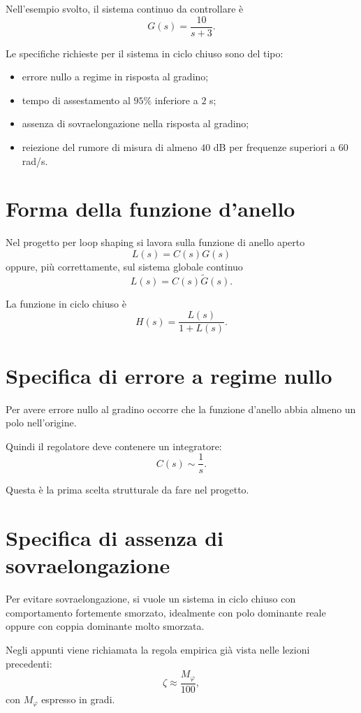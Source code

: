 Nell'esempio svolto, il sistema continuo da controllare \`e
\[
G(s)=\frac{10}{s+3}.
\]

Le specifiche richieste per il sistema in ciclo chiuso sono del tipo:
\begin{itemize}
    \item errore nullo a regime in risposta al gradino;
    \item tempo di assestamento al \(95\%\) inferiore a \(2\) s;
    \item assenza di sovraelongazione nella risposta al gradino;
    \item reiezione del rumore di misura di almeno \(40\) dB per frequenze superiori a \(60\) rad/s.
\end{itemize}

\section{Forma della funzione d'anello}

Nel progetto per loop shaping si lavora sulla funzione di anello aperto
\[
L(s)=C(s)G(s)
\]
oppure, pi\`u correttamente, sul sistema globale continuo
\[
L(s)=C(s)\tilde G(s).
\]

La funzione in ciclo chiuso \`e
\[
H(s)=\frac{L(s)}{1+L(s)}.
\]

\section{Specifica di errore a regime nullo}

Per avere errore nullo al gradino occorre che la funzione d'anello abbia almeno un polo nell'origine.

Quindi il regolatore deve contenere un integratore:
\[
C(s)\sim \frac{1}{s}.
\]

Questa \`e la prima scelta strutturale da fare nel progetto.

\section{Specifica di assenza di sovraelongazione}

Per evitare sovraelongazione, si vuole un sistema in ciclo chiuso con comportamento fortemente smorzato,
idealmente con polo dominante reale oppure con coppia dominante molto smorzata.

Negli appunti viene richiamata la regola empirica gi\`a vista nelle lezioni precedenti:
\[
\zeta \approx \frac{M_\varphi}{100},
\]
con \(M_\varphi\) espresso in gradi.

